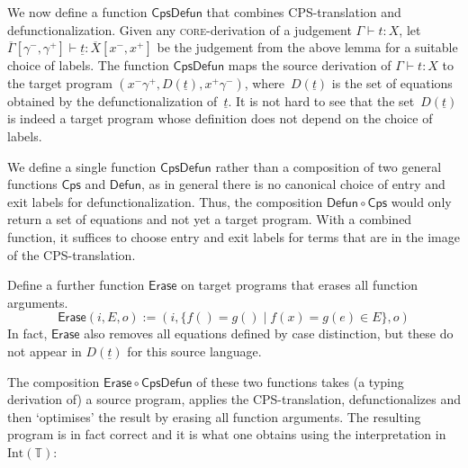\documentclass{LMCS}
\theoremstyle{definition}
\theoremstyle{plain}
\newcommand{\kw}[1]{\mathsf{#1}}
\newcommand{\SeqTm}[3]{#1 \vdash #2 \colon #3}
\newcommand{\cps}[1]{\underline{#1}}
\newcommand{\TT}{\mathbb{T}}
\newcommand{\Int}[1]{\textrm{Int}(#1)}
\begin{document}
We now define a function $\kw{CpsDefun}$ that combines CPS-translation
and defunctionalization. Given any \textsc{core}-derivation of a judgement 
$\SeqTm{\Gamma}{t}{X}$, let 
$\SeqTm{\overline \Gamma [\gamma^-, \gamma^+]}{\cps t}{\overline X [x^-, x^+]}$
be the 
judgement from the above lemma for a suitable choice of labels.
The function $\kw{CpsDefun}$ maps the source derivation of $\SeqTm{\Gamma}{t}{X}$ 
to the target program $(x^- \gamma^+, D(\cps t), x^+ \gamma^-)$,
where~$D(\cps t)$ is the set of equations obtained by
the defunctionalization of~$\cps t$.
It is not hard to see that the set~$D(\cps t)$ is indeed a 
target program whose definition does not depend on the choice of
labels. 

We define a single function $\kw{CpsDefun}$ rather than a composition of two
general functions $\kw{Cps}$ and $\kw{Defun}$, as in general there is no canonical
choice of entry and exit labels for defunctionalization. Thus,
the composition $\kw{Defun}\circ \kw{Cps}$ would only return a set of equations 
and not yet a target program. 
With a combined function, it suffices to choose entry and exit labels for 
terms that are in the image of the CPS-translation.

Define a further function $\kw{Erase}$ on target programs that
erases all function arguments.
\[
  \kw{Erase}(i, E, o) := 
   (i, \{f() = g() \mid f(x) = g(e)  \in E\}, o)
 \]
In fact, $\kw{Erase}$ also removes all equations
defined by case distinction, but these do not 
appear in $D({\cps t})$ for this source language.

The composition $\kw{Erase}\circ \kw{CpsDefun}$ of these two functions 
takes (a typing derivation of) a source program, applies the CPS-translation, defunctionalizes
and then `optimises' the result by erasing all function arguments.
The resulting program is in fact correct and it is what one obtains using the 
interpretation in $\Int\TT$:
\end{document}

